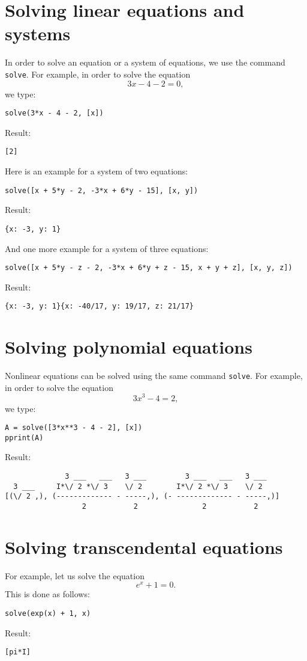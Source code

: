 \documentclass[article,A4,12pt]{llncs}
\begin{document}
\section{Solving linear equations and systems}

In order to solve an equation or a system of equations, we use the command {\tt solve}.
For example, in order to solve the equation 
$$
3x - 4 - 2 = 0,
$$
we type:
\begin{verbatim}
solve(3*x - 4 - 2, [x])
\end{verbatim}
Result:
\begin{verbatim}
[2]
\end{verbatim}
\noindent
Here is an example for a system of two equations:
\begin{verbatim}
solve([x + 5*y - 2, -3*x + 6*y - 15], [x, y])
\end{verbatim}
Result:
\begin{verbatim}
{x: -3, y: 1}
\end{verbatim}
And one more example for a system of three equations:
\begin{verbatim}
solve([x + 5*y - z - 2, -3*x + 6*y + z - 15, x + y + z], [x, y, z])
\end{verbatim}
Result:
\begin{verbatim}
{x: -3, y: 1}{x: -40/17, y: 19/17, z: 21/17}
\end{verbatim}
\noindent

\section{Solving polynomial equations}

Nonlinear equations can be solved using the same command {\tt solve}.
For example, in order to solve the equation 
$$
3x^3 - 4 = 2,
$$
we type:
\begin{verbatim}
A = solve([3*x**3 - 4 - 2], [x])
pprint(A)
\end{verbatim}
Result:
\begin{verbatim}
              3 ___   ___   3 ___         3 ___   ___   3 ___   
  3 ___     I*\/ 2 *\/ 3    \/ 2        I*\/ 2 *\/ 3    \/ 2    
[(\/ 2 ,), (------------- - -----,), (- ------------- - -----,)]
                  2           2               2           2     
\end{verbatim}

\section{Solving transcendental equations}

For example, let us solve the equation
$$
e^x + 1 = 0.
$$
This is done as follows:
\begin{verbatim}
solve(exp(x) + 1, x)
\end{verbatim}
Result:
\begin{verbatim}
[pi*I]
\end{verbatim}

\end{document}
